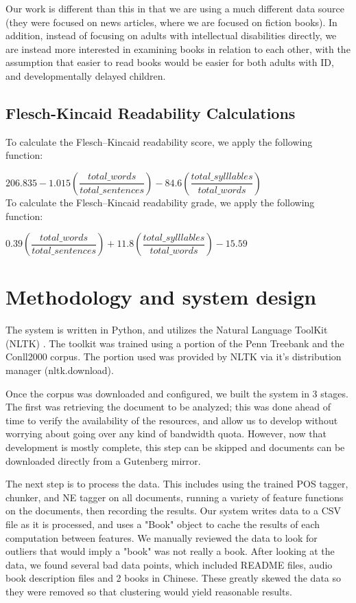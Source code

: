 \documentclass[]{article}
\begin{document}
Our work is different than this in that we are using a much different data source (they were focused on news articles, where we are focused on fiction books).
In addition, instead of focusing on adults with intellectual disabilities directly, we are instead more interested in examining books in relation to each other, with the assumption that easier to read books would be easier for both adults with ID, and developmentally delayed children.

\subsection{Flesch-Kincaid Readability Calculations}

To calculate the Flesch--Kincaid readability score, we apply the following function:

$206.835-1.015(\dfrac{total\_words}{total\_sentences})-84.6(\dfrac{total\_sylllables}{total\_words})$ \\


To calculate the Flesch--Kincaid readability grade, we apply the following function:

$0.39(\dfrac{total\_words}{total\_sentences})+11.8(\dfrac{total\_sylllables}{total\_words})-15.59$

\section{Methodology and system design}

The system is written in Python, and utilizes the Natural Language ToolKit (NLTK) \cite{loper2002nltk}.
The toolkit was trained using a portion of the Penn Treebank and the Conll2000 corpus.
The portion used was provided by NLTK via it's distribution manager (nltk.download).

Once the corpus was downloaded and configured, we built the system in 3 stages.
The first was retrieving the document to be analyzed; this was done ahead of time to verify the availability of the resources, and allow us to develop without worrying about going over any kind of bandwidth quota.
However, now that development is mostly complete, this step can be skipped and documents can be downloaded directly from a Gutenberg mirror.

The next step is to process the data.
This includes using the trained POS tagger, chunker, and NE tagger on all documents, running a variety of feature functions on the documents, then recording the results.
Our system writes data to a CSV file as it is processed, and uses a "Book" object to cache the results of each computation between features.
We manually reviewed the data to look for outliers that would imply a "book" was not really a book.
After looking at the data, we found several bad data points, which included README files, audio book description files and 2 books in Chinese.
These greatly skewed the data so they were removed so that clustering would yield reasonable results.
\end{document}

